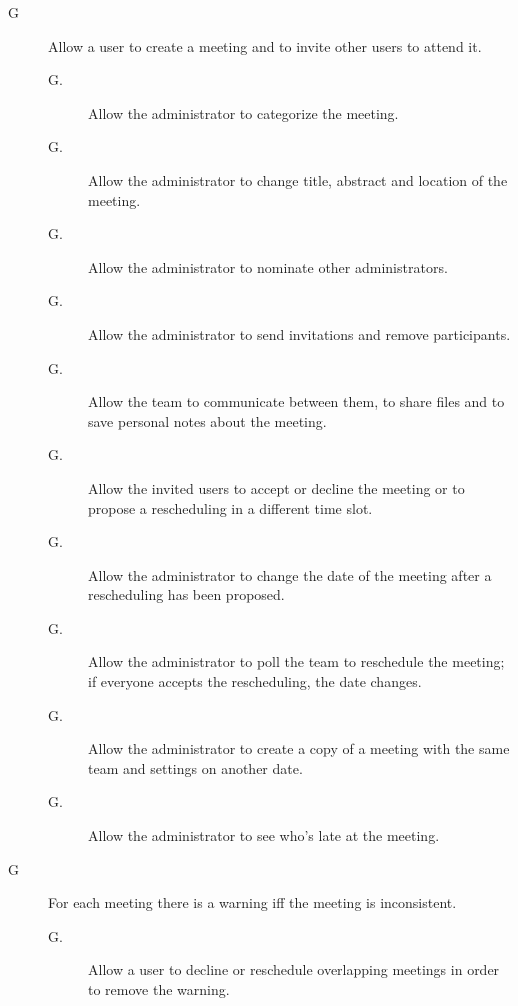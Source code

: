 \begin{description}
\item[G\thecount\label{goal:ManageMeeting}] Allow a user to create a meeting and to invite other users to attend it.
\begin{description}
\item[G\thecount.\thecountin] Allow the administrator to categorize the meeting.
\item[G\thecount.\thecountin\label{goal:EditMeeting}] Allow the administrator to change title, abstract and location of the meeting.
\item[G\thecount.\thecountin\label{goal:NominateAdmin}] Allow the administrator to nominate other administrators.
\item[G\thecount.\thecountin\label{goal:InviteUsers}] Allow the administrator to send invitations and remove participants.
\item[G\thecount.\thecountin\label{goal:ShareFiles}] Allow the team to communicate between them, to share files and to save personal notes about the meeting.
\item[G\thecount.\thecountin\label{goal:MeetingParticipation}] Allow the invited users to accept or decline the meeting or to propose a rescheduling in a different time slot.
\item[G\thecount.\thecountin\label{goal:RescheduleFromUser}] Allow the administrator to change the date of the meeting after a rescheduling has been proposed.
\item[G\thecount.\thecountin\label{goal:RescheduleFromAdmin}] Allow the administrator to poll the team to reschedule the meeting; if everyone accepts the rescheduling, the date changes.
\item[G\thecount.\thecountin\label{goal:RecreateMeeting}] Allow the administrator to create a copy of a meeting with the same team and settings on another date.
\item[G\thecount.\thecountin\label{goal:ViewLateUsers}] Allow the administrator to see who’s late at the meeting.
\end{description}

\setcounter{countin}{1}

\item[G\thecount\label{goal:Warning}] For each meeting there is a warning iff the meeting is inconsistent.
\begin{description}
\item[G\thecount.\thecountin] Allow a user to decline or reschedule overlapping meetings in order to remove the warning.
\end{description}


\end{description}
